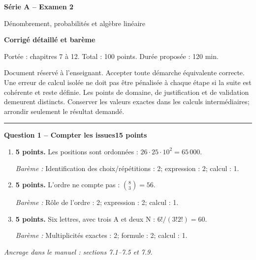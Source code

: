 \documentclass[11pt,a4paper]{article}
\begin{document}
{\LARGE\bfseries Série A -- Examen 2}\par
{\large Dénombrement, probabilités et algèbre linéaire}\par
\textbf{Corrigé détaillé et barème}\par
Portée : chapitres 7 à 12. Total : 100 points. Durée proposée : 120 min.\par
\small Document réservé à l’enseignant. Accepter toute démarche équivalente correcte. Une erreur de calcul isolée ne doit pas être pénalisée à chaque étape si la suite est cohérente et reste définie. Les points de domaine, de justification et de validation demeurent distincts. Conserver les valeurs exactes dans les calculs intermédiaires; arrondir seulement le résultat demandé.\normalsize\par
\vspace{3mm}\hrule\vspace{4mm}
{\large\bfseries Question 1 -- Compter les issues}\hfill\textbf{15 points}\par
\begin{enumerate}
\item \textbf{5 points.} Les positions sont ordonnées : \(26\cdot25\cdot10^2=65\,000\).
\par{\small\textit{Barème : }Identification des choix/répétitions : 2; expression : 2; calcul : 1.}
\item \textbf{5 points.} L’ordre ne compte pas : \(\binom83=56\).
\par{\small\textit{Barème : }Rôle de l’ordre : 2; expression : 2; calcul : 1.}
\item \textbf{5 points.} Six lettres, avec trois A et deux N : \(6!/(3!2!)=60\).
\par{\small\textit{Barème : }Multiplicités exactes : 2; formule : 2; calcul : 1.}
\end{enumerate}
\vfill {\small\textit{Ancrage dans le manuel : sections 7.1--7.5 et 7.9.}}
\end{document}
